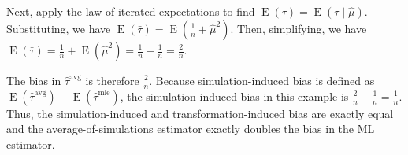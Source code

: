 \documentclass[12pt]{article}
\DeclareMathOperator*{\E}{\text{E}}
\begin{document}
Next, apply the law of iterated expectations to find $\E(\bar{\tau}) = \E(\bar{\tau} \mid \hat{\mu})$. Substituting, we have $\E(\bar{\tau}) = \E(\frac{1}{n} + \hat{\mu}^2)$. Then, simplifying, we have $\E(\bar{\tau}) = \frac{1}{n} + \E(\hat{\mu}^2) = \frac{1}{n} + \frac{1}{n} = \frac{2}{n}$.

The bias in $\hat{\tau}^\text{avg}$ is therefore $\frac{2}{n}$. Because simulation-induced bias is defined as $\E\left(\hat{\tau}^\text{avg} \right) - \E\left(\hat{\tau}^\text{mle} \right)$, the simulation-induced bias in this example is $\frac{2}{n} - \frac{1}{n} = \frac{1}{n}$. Thus, the simulation-induced and transformation-induced bias are exactly equal and the average-of-simulations estimator exactly doubles the bias in the ML estimator.


\singlespace
\clearpage
\small


\end{document}
